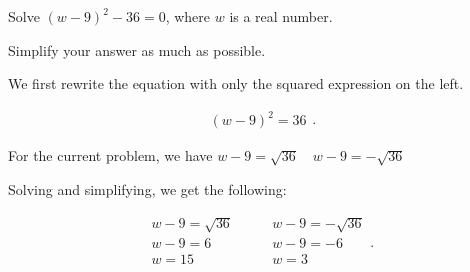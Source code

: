 
\begin{example}
  \label{exm:solve_quadratic_equation_using_square_root}

  Solve $(w - 9)^{2} - 36 = 0$, where $w$ is a real number.

  Simplify your answer as much as possible.

  We first rewrite the equation with only the squared expression on the left.

  \begin{equation}
    \label{eqt:step_1}
    \begin{split}
      (w - 9)^{2} = 36
    \end{split}
  .\end{equation}

  For the current problem, we have $w - 9 = \sqrt{36} \quad w - 9 = -\sqrt{36}$

  Solving and simplifying, we get the following:

  \begin{equation}
    \label{eqt:final_steps}
    \begin{split}
      w - 9 = \sqrt{36} \quad & \quad w - 9 = -\sqrt{36} \\
      w - 9 = 6 \quad & \quad w - 9 = -6 \\
      \boxed{w = 15} \quad & \quad \boxed{w = 3} \\
    \end{split}
  .\end{equation}
\end{example}

\newpage
